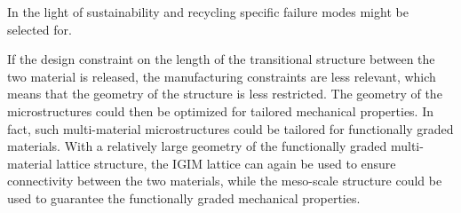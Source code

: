 In the light of sustainability and recycling specific failure modes might be selected for.

If the design constraint on the length of the transitional structure between the two material is released,
the manufacturing constraints are less relevant, which means that the geometry of the structure is less restricted.
The geometry of the microstructures could then be optimized for tailored mechanical properties.
In fact, such multi-material microstructures could be tailored for functionally graded materials.
With a relatively large geometry of the functionally graded multi-material lattice structure,
the IGIM lattice can again be used to ensure connectivity between the two materials,
while the meso-scale structure could be used to guarantee the functionally graded mechanical properties.
